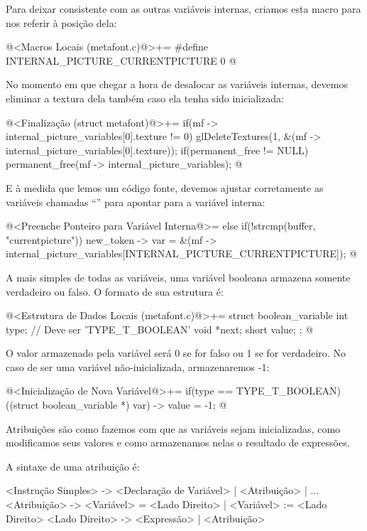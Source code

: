 Para deixar consistente com as outras variáveis internas, criamos esta
macro para nos referir à posição dela:

\iniciocodigo
@<Macros Locais (metafont.c)@>+=
#define INTERNAL_PICTURE_CURRENTPICTURE 0
@
\fimcodigo

No momento em que chegar a hora de desalocar as variáveis internas,
devemos eliminar a textura dela também caso ela tenha sido
inicializada:

\iniciocodigo
@<Finalização (struct metafont)@>+=
if(mf -> internal_picture_variables[0].texture != 0)
  glDeleteTextures(1, &(mf -> internal_picture_variables[0].texture));
if(permanent_free != NULL)
  permanent_free(mf -> internal_picture_variables);
@
\fimcodigo

E à medida que lemos um código fonte, devemos ajustar corretamente as
variáveis chamadas ``'' para apontar para a
variável interna:

\iniciocodigo
@<Preenche Ponteiro para Variável Interna@>=
else if(!strcmp(buffer, "currentpicture"))
  new_token -> var =
          &(mf -> internal_picture_variables[INTERNAL_PICTURE_CURRENTPICTURE]);
@
\fimcodigo


A mais simples de todas as variáveis, uma variável booleana armazena
somente verdadeiro ou falso. O formato de sua estrutura é:

\iniciocodigo
@<Estrutura de Dados Locais (metafont.c)@>+=
struct boolean_variable{
  int type; // Deve ser 'TYPE_T_BOOLEAN'
  void *next;
  short value;
};
@
\fimcodigo

O valor  armazenado pela variável será 0 se for
falso ou 1 se for verdadeiro. No caso de ser uma variável
não-inicializada, armazenaremos -1:

\iniciocodigo
@<Inicialização de Nova Variável@>+=
if(type == TYPE_T_BOOLEAN)
  ((struct boolean_variable *) var) -> value = -1;
@
\fimcodigo



Atribuições são como fazemos com que as variáveis sejam inicializadas,
como modificamos seus valores e como armazenamos nelas o resultado de
expressões.

A sintaxe de uma atribuição é:

\alinhaverbatim
<Instrução Simples> -> <Declaração de Variável> | <Atribuição> | ...
<Atribuição> -> <Variável> = <Lado Direito> |
                <Variável> := <Lado Direito>
<Lado Direito> -> <Expressão> | <Atribuição>
\alinhanormal

